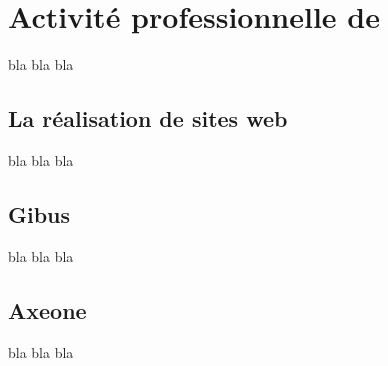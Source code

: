 \chapter{Activité professionnelle de \fidit}
bla bla bla

\section{La réalisation de sites web}
bla bla bla

\section{Gibus}
bla bla bla

\section{Axeone}
bla bla bla
